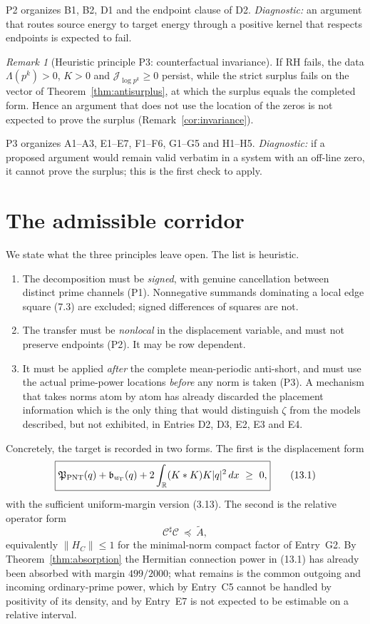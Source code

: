 \documentclass[11pt]{amsart}
\theoremstyle{definition}
\theoremstyle{remark}
\newtheorem{remark}[theorem]{Remark}
\newcommand{\R}{\mathbb R}
\newcommand{\dd}{\,d}
\begin{document}
P2 organizes B1, B2, D1 and the endpoint clause of D2.
\emph{Diagnostic:} an argument that routes source energy to target energy
through a positive kernel that respects endpoints is expected to fail.

\begin{remark}[Heuristic principle P3: counterfactual invariance]
If RH fails, the data \(\Lambda(p^k)>0\), \(K>0\) and
\(\mathcal J_{\log p^k}\ge0\) persist, while the strict surplus fails on
the vector of Theorem~\ref{thm:antisurplus}, at which the surplus equals
the completed form.  Hence an argument that does not use the location of
the zeros is not expected to prove the surplus (Remark~\ref{cor:invariance}).
\end{remark}

P3 organizes A1--A3, E1--E7, F1--F6, G1--G5 and H1--H5.
\emph{Diagnostic:} if a proposed argument would remain valid verbatim in
a system with an off-line zero, it cannot prove the surplus; this is the
first check to apply.

\section{The admissible corridor}
\label{sec:corridor}

We state what the three principles leave open.  The list is heuristic.

\begin{enumerate}
\item The decomposition must be \emph{signed}, with genuine cancellation
 between distinct prime channels (P1).  Nonnegative summands dominating a
 local edge square (7.3) are excluded; signed differences of squares are
 not.
\item The transfer must be \emph{nonlocal} in the displacement variable,
 and must not preserve endpoints (P2).  It may be row dependent.
\item It must be applied \emph{after} the complete mean-periodic
 anti-short, and must use the actual prime-power locations \emph{before}
 any norm is taken (P3).  A mechanism that takes norms atom by atom has
 already discarded the placement information which is the only thing that
 would distinguish \(\zeta\) from the models described, but not
 exhibited, in Entries D2, D3, E2, E3 and E4.
\end{enumerate}

Concretely, the target is recorded in two forms.  The first is the
displacement form
\[
 \boxed{
 \mathfrak P_{\rm PNT}(q)+\mathfrak b_{w_\Gamma}(q)
 +2\int_\R(K*K)K|q|^2\dd x\ \ge\ 0 ,}
\tag{13.1}
\]
with the sufficient uniform-margin version (3.13).  The second is the
relative operator form
\[
 \boxed{\mathcal C^\sharp\mathcal C\ \preceq\ \widetilde A ,}
\tag{13.2}
\]
equivalently \(\|H_C\|\le1\) for the minimal-norm compact factor of
Entry~G2.  By Theorem~\ref{thm:absorption} the Hermitian connection power
in (13.1) has already been absorbed with margin \(499/2000\); what remains
is the common outgoing and incoming ordinary-prime power, which by
Entry~C5 cannot be handled by positivity of its density, and by
Entry~E7 is not expected to be estimable on a relative interval.
\end{document}
